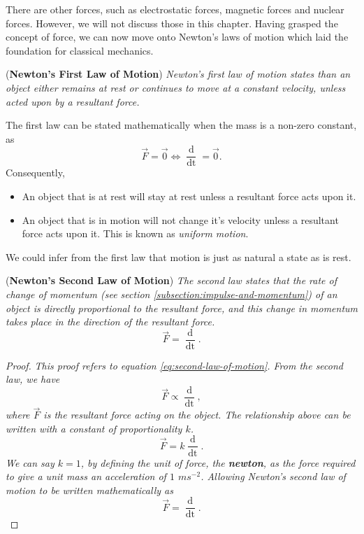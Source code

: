 There are other forces, such as electrostatic forces, magnetic forces and nuclear forces. However, we will not discuss those in this chapter. Having grasped the concept of force, we can now move onto Newton's laws of motion which laid the foundation for classical mechanics. 

\begin{theorem}{(\textbf{Newton's First Law of Motion})}
\textit{Newton's first law of motion states than an object either remains at rest or continues to move at a constant velocity, unless acted upon by a resultant force.}
\end{theorem}

\noindent The first law can be stated mathematically when the mass is a non-zero constant, as
\begin{equation}
    \vec{F} = \vec{0} \iff \frac{\mathop{\mathrm{d}\vec{v}}}{\mathop{\mathrm{d}t}} = \vec{0}.
\end{equation}
Consequently,
\begin{itemize}
    \item An object that is at rest will stay at rest unless a resultant force acts upon it.
    \item An object that is in motion will not change it's velocity unless a resultant force acts upon it. This is known as \textit{uniform motion}.
\end{itemize}
We could infer from the first law that motion is just as natural a state as is rest. 

\begin{theorem}{(\textbf{Newton's Second Law of Motion})}
\textit{The second law states that the rate of change of momentum (see section \ref{subsection:impulse-and-momentum}) of an object is directly proportional to the resultant force, and this change in momentum takes place in the direction of the resultant force.}
\begin{equation}
    \label{eq:second-law-of-motion}
    \vec{F} = \frac{\mathop{\mathrm{d}\vec{p}}}{\mathop{\mathrm{d}t}}.
\end{equation}
\begin{proof}
\textit{This proof refers to equation \ref{eq:second-law-of-motion}. From the second law, we have}
\begin{equation*}
    \vec{F} \propto \frac{\mathop{\mathrm{d}\vec{p}}}{\mathop{\mathrm{d}t}},
\end{equation*}
\textit{where $\vec{F}$ is the resultant force acting on the object. The relationship above can be written with a constant of proportionality $k$.}
\begin{equation*}
    \vec{F} = k \frac{\mathop{\mathrm{d}\vec{p}}}{\mathop{\mathrm{d}t}}.
\end{equation*}
\textit{We can say $k = 1$, by defining the unit of force, the \textbf{newton}, as the force required to give a unit mass an acceleration of $1$ $ms^{-2}$. Allowing Newton's second law of motion to be written mathematically as} 
\begin{equation*}
    \vec{F} = \frac{\mathop{\mathrm{d}\vec{p}}}{\mathop{\mathrm{d}t}}.
\end{equation*}
\end{proof}
\end{theorem}

